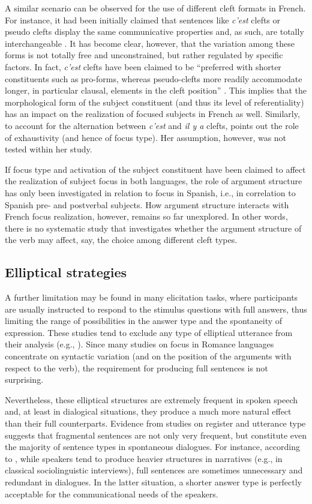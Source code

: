 A similar scenario can be observed for the use of different cleft formats in French. For instance, it had been initially claimed that sentences like \textit{c’est} clefts or pseudo clefts display the same communicative properties and, as such, are totally interchangeable \parencite{akmajian1970deriving}. It has become clear, however, that the variation among these forms is not totally free and unconstrained, but rather regulated by specific factors. In fact, \textit{c'est} clefts have been claimed to be “preferred with shorter constituents such as pro-forms, whereas pseudo-clefts more readily accommodate longer, in particular clausal, elements in the cleft  position” \parencite[24]{dufter201614}. This implies that the morphological form of the subject constituent (and thus its level of referentiality) has an impact on the realization of focused subjects in French as well. Similarly, to account for the alternation between \textit{c’est} and \textit{il y a} clefts, \textcite{karssenberg2017oiseaux} points out the role of exhaustivity (and hence of focus type). Her assumption, however, was not tested within her study.

If focus type and activation of the subject constituent have been claimed to affect the realization of subject focus in both languages, the role of argument structure has only been investigated in relation to focus in Spanish, i.e., in correlation to Spanish pre- and postverbal subjects. How argument structure interacts with French focus realization, however, remains so far unexplored. In other words, there is no systematic study that investigates whether the argument structure of the verb may affect, say, the choice among different cleft types.

\subsection{Elliptical strategies}
A further limitation may be found in many elicitation tasks, where participants are usually instructed to respond to the stimulus questions with full answers, thus limiting the range of possibilities in the answer type and the spontaneity of expression. These studies tend to exclude any type of elliptical utterance from their analysis (e.g., \cite{skopeteas2010focus}). Since many studies on focus in Romance languages concentrate on syntactic variation (and on the position of the arguments with respect to the verb), the requirement for producing full sentences is not surprising. 

Nevertheless, these elliptical structures are extremely frequent in spoken speech and, at least in dialogical situations, they produce a much more natural effect than their full counterparts. Evidence from studies on register and utterance type suggests that fragmental sentences are not only very frequent, but constitute even the majority of sentence types in spontaneous dialogues. For instance, according to \textcite{du1987discourse}, while speakers tend to produce heavier structures in narratives (e.g., in classical sociolinguistic interviews), full sentences are sometimes unnecessary and redundant in dialogues. In the latter situation, a shorter answer type is perfectly acceptable for the communicational needs of the speakers.

